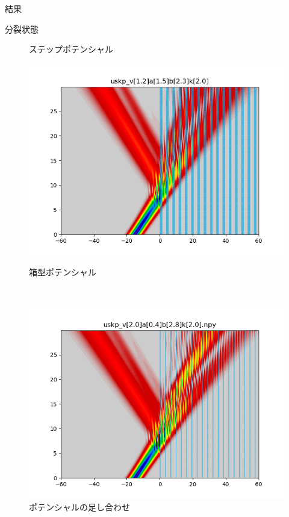 \documentclass[a4paper, lualatex]{bxjsarticle}
\begin{document}
\begin{section}{結果}
\begin{subsection}{分裂状態}
\begin{figure}[h]
\begin{minipage}{0.5\hsize}
                \caption{ステップポテンシャル}
            \end{minipage}
            \begin{minipage}{0.5\hsize}
                \centering
                \includegraphics[width=0.9\hsize]{bunretsu2.png}
                \caption{箱型ポテンシャル}
            \end{minipage}\\
            \begin{minipage}{0.5\hsize}
                \centering
                \includegraphics[width=0.9\hsize]{bunretsu3.png}
                \caption{ポテンシャルの足し合わせ}
            \end{minipage}
            \begin{minipage}{0.5\hsize}
                \centering

\end{minipage}
\end{figure}
\end{subsection}
\end{section}
\end{document}

